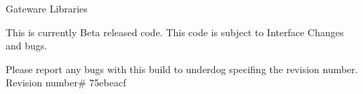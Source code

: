 Gateware Libraries

This is currently Beta released code. This code is subject to Interface Changes and bugs.

Please report any bugs with this build to underdog specifing the revision number. Revision number\# 75ebeacf 